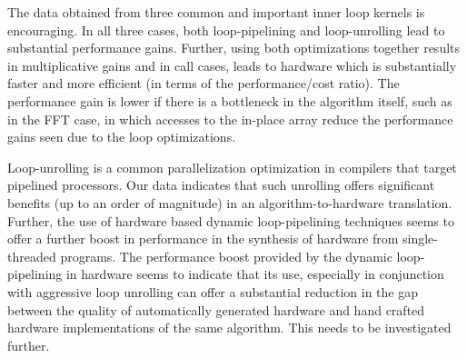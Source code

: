 \documentclass[conference]{IEEEtran}
\begin{document}
The data obtained from three common and important inner loop
kernels is encouraging.  In all three cases, both loop-pipelining
and loop-unrolling lead to substantial performance gains.  Further,
using both optimizations together results in multiplicative gains
and in call cases, leads to hardware which is substantially
faster and more efficient (in terms of the performance/cost ratio).
The performance gain is lower if there is a bottleneck in the
algorithm itself, such as in the FFT case, in which accesses to
the in-place array reduce the performance gains seen due to
the loop optimizations.

Loop-unrolling is a common parallelization optimization
in compilers that target pipelined processors.  Our data indicates
that such unrolling offers significant benefits (up to an 
order of magnitude) in an algorithm-to-hardware translation.
Further, the use of hardware based dynamic loop-pipelining techniques 
seems to offer a further boost in performance in the synthesis
of hardware from single-threaded programs.  
The performance boost provided by the dynamic loop-pipelining
in hardware seems to indicate that its use,
especially in conjunction with aggressive loop unrolling can offer 
a substantial reduction in the gap between 
the quality of automatically generated hardware and hand crafted 
hardware implementations of the same algorithm.  This needs
to be investigated further.




\end{document}
